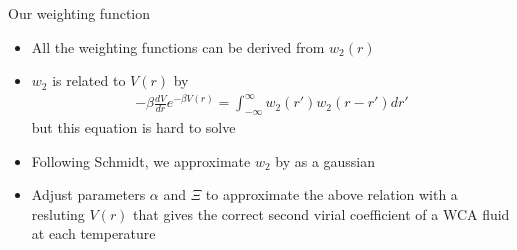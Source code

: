\documentclass{beamer}
\renewcommand{\vec}[1]{\mathbf{#1}}
\begin{document}
\begin{frame}{Our weighting function}
    \begin{itemize}
        \item All the weighting functions can be derived from $w_2(r)$
        \item $w_2$ is related to $V(r)$ by
        \begin{align}
          -\beta \frac{dV}{dr}e^{-\beta V(r)}
             = \int_{-\infty}^{\infty}w_2(r')w_2(r-r')dr'
      \end{align}
      but this equation is hard to solve
      \item Following Schmidt, we approximate $w_2$ by as a gaussian
      \item Adjust parameters $\alpha$ and $\Xi$ to approximate the above relation with a resluting $V(r)$
that gives the correct second virial coefficient of a WCA fluid at each temperature
    \end{itemize}

\end{frame}
\end{document}
